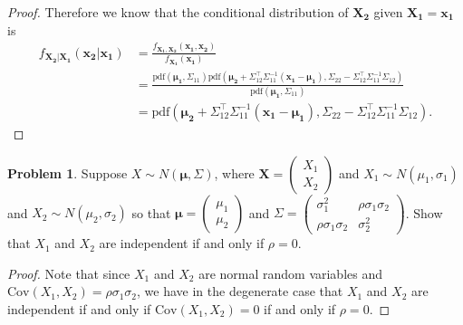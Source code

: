 \documentclass[12pt]{article}
\theoremstyle{definition}
\newtheorem{problem}{Problem}
\newcommand{\pdf}{\text{pdf}}
\newcommand{\vect}[1]{\boldsymbol{#1}}
\begin{document}
\begin{proof}
   Therefore we know that the conditional distribution of $\vect{X_2}$ given $\vect{X_1} = \vect{x_1}$ is
   \begin{align*}
     f_{\vect{X_2}|\vect{X_1}}(\vect{x_2}|\vect{x_1})
     &= \frac{f_{\vect{X_1}, \vect{X_2}}(\vect{x_1}, \vect{x_2})}{f_{\vect{X_1}}(\vect{x_1})} \\
     &= \frac{\pdf(\vect{\mu_1}, \Sigma_{11}) \pdf(\vect{\mu_2} + \Sigma_{12}^\intercal\Sigma_{11}^{-1}(\vect{x_1} - \vect{\mu_1}), \Sigma_{22} - \Sigma_{12}^\intercal \Sigma_{11}^{-1} \Sigma_{12})}{\pdf(\vect{\mu_1}, \Sigma_{11})} \\
     &= \pdf(\vect{\mu_2} + \Sigma_{12}^\intercal\Sigma_{11}^{-1}(\vect{x_1} - \vect{\mu_1}), \Sigma_{22} - \Sigma_{12}^\intercal \Sigma_{11}^{-1} \Sigma_{12}).
   \end{align*}
\end{proof}


\begin{problem}
  Suppose $X \sim N(\vect{\mu}, \Sigma)$, where $\vect{X} = \begin{pmatrix} X_1 \\ X_2 \end{pmatrix}$
  and $X_1 \sim N(\mu_1, \sigma_1)$ and $X_2 \sim N(\mu_2, \sigma_2)$ so that
  $\vect{\mu} = \begin{pmatrix} \mu_1 \\ \mu_2 \end{pmatrix}$ and
  $\Sigma = \begin{pmatrix} \sigma_1 ^ 2 & \rho\sigma_1\sigma_2 \\ \rho\sigma_1\sigma_2 & \sigma_2 ^ 2\end{pmatrix}$.
  Show that $X_1$ and $X_2$ are independent if and only if $\rho = 0$.
\end{problem}

\begin{proof}
  Note that since $X_1$ and $X_2$ are normal random variables and
  $\text{Cov}(X_1, X_2) = \rho\sigma_1\sigma_2$, we have in the degenerate case
  that $X_1$ and $X_2$ are independent if and only if $\text{Cov}(X_1, X_2) = 0$
  if and only if $\rho = 0$.
\end{proof}
\end{document}
